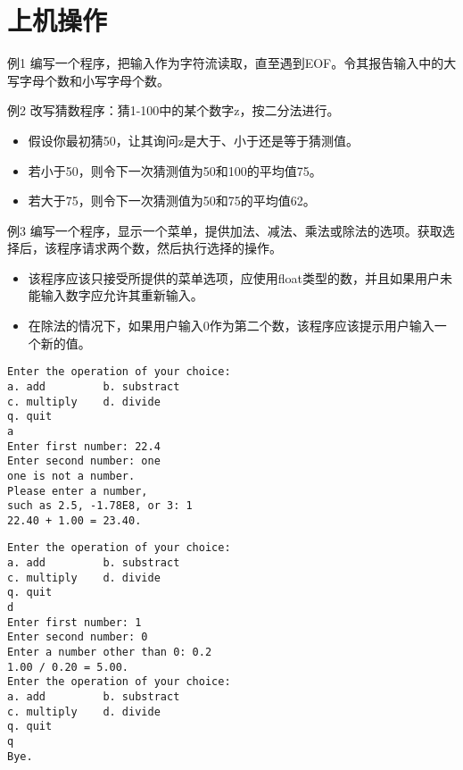 \section{上机操作}

\begin{frame}[fragile]\ft{\secname}
\begin{block}{例1}
编写一个程序，把输入作为字符流读取，直至遇到EOF。令其报告输入中的大写字母个数和小写字母个数。
\end{block}
\end{frame}

\begin{frame}[fragile]\ft{\secname}
\begin{block}{例2}
改写猜数程序：猜1-100中的某个数字z，按二分法进行。
\begin{itemize}
\item 
假设你最初猜50，让其询问z是大于、小于还是等于猜测值。
\item
若小于50，则令下一次猜测值为50和100的平均值75。
\item
若大于75，则令下一次猜测值为50和75的平均值62。
\end{itemize}
\end{block}
\end{frame}

\begin{frame}[fragile]\ft{\secname}
\begin{block}{例3}
编写一个程序，显示一个菜单，提供加法、减法、乘法或除法的选项。获取选择后，该程序请求两个数，然后执行选择的操作。
\begin{itemize}
\item 
该程序应该只接受所提供的菜单选项，应使用float类型的数，并且如果用户未能输入数字应允许其重新输入。
\item
在除法的情况下，如果用户输入0作为第二个数，该程序应该提示用户输入一个新的值。
\end{itemize}
\end{block}
\end{frame}

\begin{frame}[fragile]\ft{\secname}
\begin{lstlisting}
Enter the operation of your choice:
a. add         b. substract
c. multiply    d. divide
q. quit
a
Enter first number: 22.4
Enter second number: one
one is not a number.
Please enter a number,
such as 2.5, -1.78E8, or 3: 1
22.40 + 1.00 = 23.40.
\end{lstlisting}
\end{frame}

\begin{frame}[fragile]\ft{\secname}
\begin{lstlisting}[backgroundcolor=\color{blue!20}]
Enter the operation of your choice:
a. add         b. substract
c. multiply    d. divide
q. quit
d
Enter first number: 1
Enter second number: 0
Enter a number other than 0: 0.2
1.00 / 0.20 = 5.00.
Enter the operation of your choice:
a. add         b. substract
c. multiply    d. divide
q. quit
q
Bye.
\end{lstlisting}
\end{frame}

